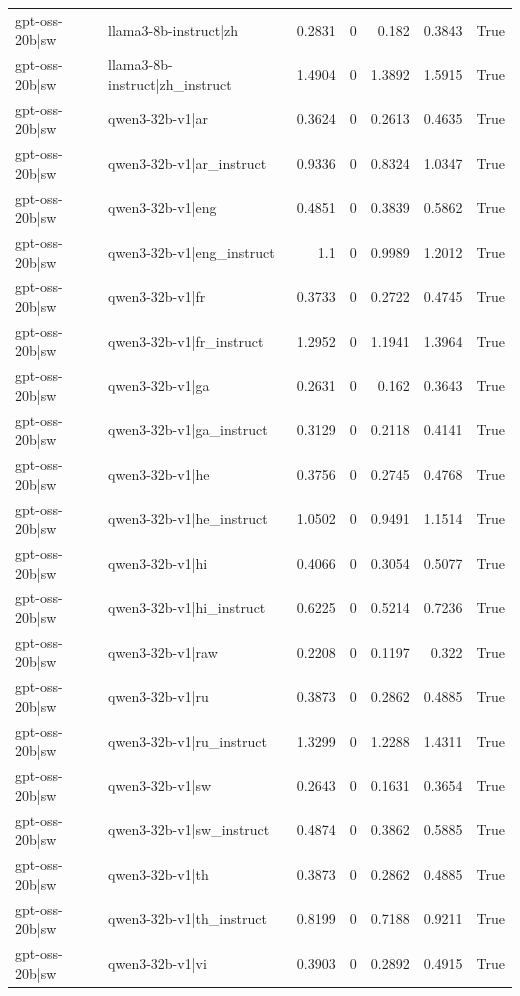 \begin{table}
\begin{tabular}{l l r r r r l}
gpt-oss-20b|sw & llama3-8b-instruct|zh & 0.2831 & 0 & 0.182 & 0.3843 & True \\
gpt-oss-20b|sw & llama3-8b-instruct|zh_instruct & 1.4904 & 0 & 1.3892 & 1.5915 & True \\
gpt-oss-20b|sw & qwen3-32b-v1|ar & 0.3624 & 0 & 0.2613 & 0.4635 & True \\
gpt-oss-20b|sw & qwen3-32b-v1|ar_instruct & 0.9336 & 0 & 0.8324 & 1.0347 & True \\
gpt-oss-20b|sw & qwen3-32b-v1|eng & 0.4851 & 0 & 0.3839 & 0.5862 & True \\
gpt-oss-20b|sw & qwen3-32b-v1|eng_instruct & 1.1 & 0 & 0.9989 & 1.2012 & True \\
gpt-oss-20b|sw & qwen3-32b-v1|fr & 0.3733 & 0 & 0.2722 & 0.4745 & True \\
gpt-oss-20b|sw & qwen3-32b-v1|fr_instruct & 1.2952 & 0 & 1.1941 & 1.3964 & True \\
gpt-oss-20b|sw & qwen3-32b-v1|ga & 0.2631 & 0 & 0.162 & 0.3643 & True \\
gpt-oss-20b|sw & qwen3-32b-v1|ga_instruct & 0.3129 & 0 & 0.2118 & 0.4141 & True \\
gpt-oss-20b|sw & qwen3-32b-v1|he & 0.3756 & 0 & 0.2745 & 0.4768 & True \\
gpt-oss-20b|sw & qwen3-32b-v1|he_instruct & 1.0502 & 0 & 0.9491 & 1.1514 & True \\
gpt-oss-20b|sw & qwen3-32b-v1|hi & 0.4066 & 0 & 0.3054 & 0.5077 & True \\
gpt-oss-20b|sw & qwen3-32b-v1|hi_instruct & 0.6225 & 0 & 0.5214 & 0.7236 & True \\
gpt-oss-20b|sw & qwen3-32b-v1|raw & 0.2208 & 0 & 0.1197 & 0.322 & True \\
gpt-oss-20b|sw & qwen3-32b-v1|ru & 0.3873 & 0 & 0.2862 & 0.4885 & True \\
gpt-oss-20b|sw & qwen3-32b-v1|ru_instruct & 1.3299 & 0 & 1.2288 & 1.4311 & True \\
gpt-oss-20b|sw & qwen3-32b-v1|sw & 0.2643 & 0 & 0.1631 & 0.3654 & True \\
gpt-oss-20b|sw & qwen3-32b-v1|sw_instruct & 0.4874 & 0 & 0.3862 & 0.5885 & True \\
gpt-oss-20b|sw & qwen3-32b-v1|th & 0.3873 & 0 & 0.2862 & 0.4885 & True \\
gpt-oss-20b|sw & qwen3-32b-v1|th_instruct & 0.8199 & 0 & 0.7188 & 0.9211 & True \\
gpt-oss-20b|sw & qwen3-32b-v1|vi & 0.3903 & 0 & 0.2892 & 0.4915 & True \\

\end{tabular}
\end{table}
